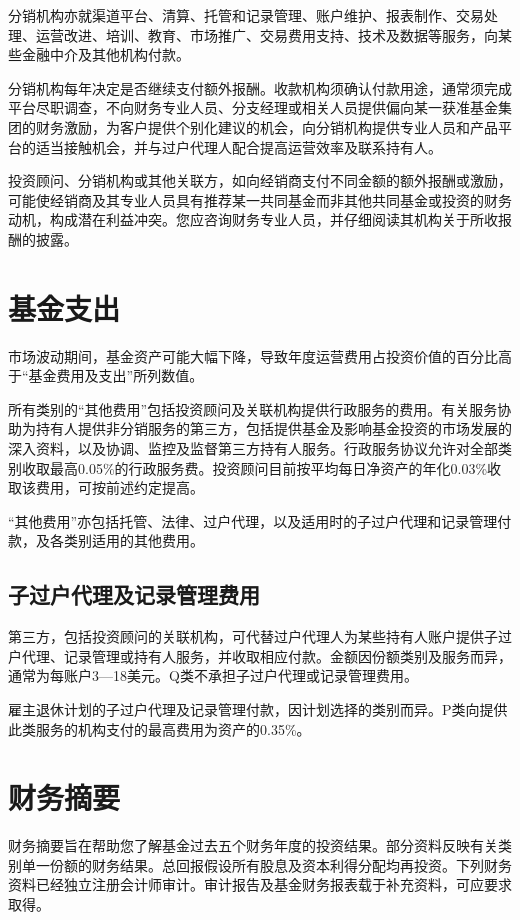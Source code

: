 \documentclass[UTF8,fontset=none,11pt,a4paper]{ctexart}
\begin{document}
分销机构亦就渠道平台、清算、托管和记录管理、账户维护、报表制作、交易处理、运营改进、培训、教育、市场推广、交易费用支持、技术及数据等服务，向某些金融中介及其他机构付款。


分销机构每年决定是否继续支付额外报酬。收款机构须确认付款用途，通常须完成平台尽职调查，不向财务专业人员、分支经理或相关人员提供偏向某一获准基金集团的财务激励，为客户提供个别化建议的机会，向分销机构提供专业人员和产品平台的适当接触机会，并与过户代理人配合提高运营效率及联系持有人。


投资顾问、分销机构或其他关联方，如向经销商支付不同金额的额外报酬或激励，可能使经销商及其专业人员具有推荐某一共同基金而非其他共同基金或投资的财务动机，构成潜在利益冲突。您应咨询财务专业人员，并仔细阅读其机构关于所收报酬的披露。


\section*{基金支出}
市场波动期间，基金资产可能大幅下降，导致年度运营费用占投资价值的百分比高于“基金费用及支出”所列数值。


所有类别的“其他费用”包括投资顾问及关联机构提供行政服务的费用。有关服务协助为持有人提供非分销服务的第三方，包括提供基金及影响基金投资的市场发展的深入资料，以及协调、监控及监督第三方持有人服务。行政服务协议允许对全部类别收取最高0.05\%的行政服务费。投资顾问目前按平均每日净资产的年化0.03\%收取该费用，可按前述约定提高。


“其他费用”亦包括托管、法律、过户代理，以及适用时的子过户代理和记录管理付款，及各类别适用的其他费用。


\subsection*{子过户代理及记录管理费用}
第三方，包括投资顾问的关联机构，可代替过户代理人为某些持有人账户提供子过户代理、记录管理或持有人服务，并收取相应付款。金额因份额类别及服务而异，通常为每账户3—18美元。Q类不承担子过户代理或记录管理费用。


雇主退休计划的子过户代理及记录管理付款，因计划选择的类别而异。P类向提供此类服务的机构支付的最高费用为资产的0.35\%。


\section*{财务摘要}
财务摘要旨在帮助您了解基金过去五个财务年度的投资结果。部分资料反映有关类别单一份额的财务结果。总回报假设所有股息及资本利得分配均再投资。下列财务资料已经独立注册会计师审计。审计报告及基金财务报表载于补充资料，可应要求取得。
\end{document}
